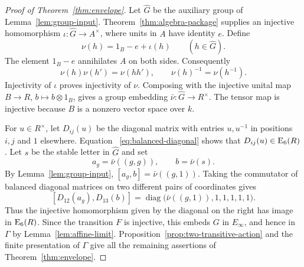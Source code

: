 \begin{proof}[Proof of Theorem~\ref{thm:envelope}]
Let $\widehat G$ be the auxiliary group of
Lemma~\ref{lem:group-input}.  Theorem~\ref{thm:algebra-package} supplies
an injective homomorphism $\iota:\widehat G\to A^\times$, where units
in $A$ have identity $e$.  Define
\[
 \nu(h)=1_B-e+\iota(h)\qquad(h\in\widehat G).
\]
The element $1_B-e$ annihilates $A$ on both sides.  Consequently
\[
 \nu(h)\nu(h')=\nu(hh'),\qquad
 \nu(h)^{-1}=\nu(h^{-1}).
\]
Injectivity of $\iota$ proves injectivity of $\nu$.  Composing with the
injective unital map $B\to R$, $b\mapsto b\otimes1_B$, gives a group
embedding $\bar\nu:\widehat G\to R^\times$.  The tensor map is
injective because $B$ is a nonzero vector space over $k$.

For $u\in R^\times$, let $D_{ij}(u)$ be the diagonal matrix with
entries $u,u^{-1}$ in positions $i,j$ and $1$ elsewhere.  Equation~
\eqref{eq:balanced-diagonal} shows that $D_{ij}(u)\in\operatorname{E}_6(R)$.
Let $s$ be the stable letter in $\widehat G$ and set
\[
 a_g=\bar\nu((g,g)),\qquad b=\bar\nu(s).
\]
By Lemma~\ref{lem:group-input},
$[a_g,b]=\bar\nu((g,1))$.  Taking the commutator of balanced diagonal
matrices on two different pairs of coordinates gives
\[
 [D_{12}(a_g),D_{13}(b)]
 =\operatorname{diag}\bigl(\bar\nu((g,1)),1,1,1,1,1\bigr).
\]
Thus the injective homomorphism given by the diagonal on the right
has image in $\operatorname{E}_6(R)$.  Since the transition $F$ is injective, this
embeds $G$ in $E_\infty$, and hence in $\Gamma$ by
Lemma~\ref{lem:affine-limit}.  Proposition~\ref{prop:two-transitive-action}
and the finite presentation of $\Gamma$ give all the remaining
assertions of Theorem~\ref{thm:envelope}.
\end{proof}

